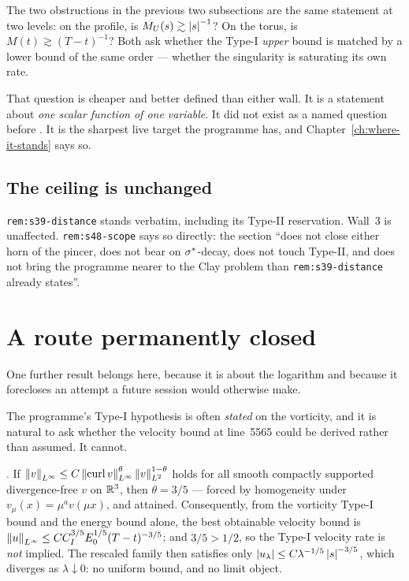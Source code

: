 \begin{obsv}
\label{obs:saturation-is-the-target}
The two obstructions in the previous two subsections are the same statement at
two levels: on the profile, is \(M_U(s)\gtrsim\left|s\right|^{-1}\)? On the torus, is
\(M(t)\gtrsim(T-t)^{-1}\)? Both ask whether the Type-I \emph{upper} bound is
matched by a lower bound of the same order --- whether the singularity is
saturating its own rate.

\smallskip
That question is cheaper and better defined than either wall. It is a
statement about \emph{one scalar function of one variable}. It did not exist
as a named question before . It is the sharpest live target the
programme has, and Chapter~\ref{ch:where-it-stands} says so.
\end{obsv}

\subsection{The ceiling is unchanged}

\texttt{rem:s39-distance} stands verbatim, including its Type-II reservation.
Wall~3 is unaffected. \texttt{rem:s48-scope} says so directly: the section
``does not close either horn of the pincer, does not bear on
\(\sigma^{*}\)-decay, does not touch Type-II, and does not bring the programme
nearer to the Clay problem than \texttt{rem:s39-distance} already states''.

\section{A route permanently closed}
\label{sec:bridge-fails}

One further  result belongs here, because it is about the logarithm and
because it forecloses an attempt a future session would otherwise make.

The programme's Type-I hypothesis is often \emph{stated} on the vorticity, and
it is natural to ask whether the velocity bound at line~5565 could be derived
rather than assumed. It cannot.

\begin{statement}
\label{st:bridge-fails}
\IMPOSSIBLE{}. If
\(\left\|v\right\|_{L^\infty}\le C\left\|\operatorname{curl}v\right\|_{L^\infty}^{\theta}\left\|v\right\|_{L^2}^{1-\theta}\)
holds for all smooth compactly supported divergence-free \(v\) on \(\mathbb{R}^3\),
then \(\theta=3/5\) --- forced by homogeneity under
\(v_\mu(x)=\mu^a v(\mu x)\), and attained. Consequently, from the vorticity
Type-I bound and the energy bound alone, the best obtainable velocity bound is
\(\left\|u\right\|_{L^\infty}\le CC_I^{3/5}E_0^{1/5}(T-t)^{-3/5}\); and
\(3/5>1/2\), so the Type-I velocity rate is \emph{not} implied. The rescaled
family then satisfies only \(\left|u_\lambda\right|\le C\lambda^{-1/5}\left|s\right|^{-3/5}\),
which diverges as \(\lambda\downarrow0\): no uniform bound, and no limit
object.
\end{statement}

